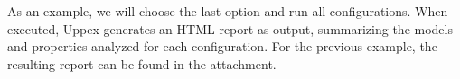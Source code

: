 As an example, we will choose the last option and run all configurations. When executed, Uppex generates an HTML report as output, summarizing the models and properties analyzed for each configuration. For the previous example, the resulting report can be found in the attachment.









